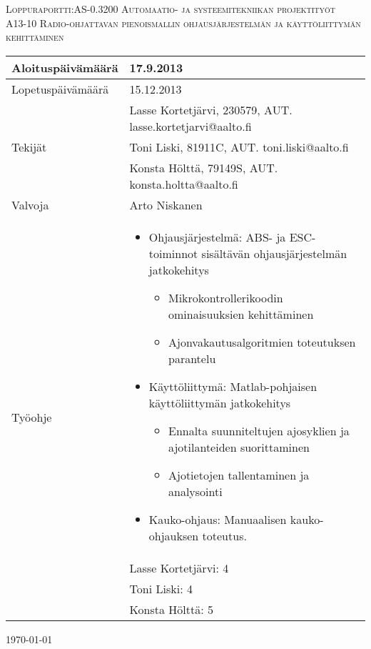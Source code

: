 \begin{titlepage}
\begin{center}

\textsc{ \LARGE Loppuraportti:AS-0.3200 Automaatio- ja systeemitekniikan projektityöt }\\[1.5cm]

\textsc{ \Large A13-10 Radio-ohjattavan pienoismallin ohjausjärjestelmän ja käyttöliittymän kehittäminen }\\[0.5cm]

\begin{tabular}{ l | p{12cm} }
	\hline
	Aloituspäivämäärä & 17.9.2013\\

	\hline
	Lopetuspäivämäärä & 15.12.2013\\

	\hline
	\multirow{3}{*}{Tekijät}
	& Lasse Kortetjärvi, 230579, AUT. lasse.kortetjarvi@aalto.fi\\
	& Toni Liski, 81911C, AUT. toni.liski@aalto.fi\\
	& Konsta Hölttä, 79149S, AUT. konsta.holtta@aalto.fi\\

	\hline
	Valvoja & Arto Niskanen\\

	\hline
	\multirow{8}{*}{Työohje} &
	\begin{itemize}
	\item Ohjausjärjestelmä: ABS- ja ESC-toiminnot sisältävän ohjausjärjestelmän jatkokehitys\begin{itemize}
	\item Mikrokontrollerikoodin ominaisuuksien kehittäminen
	\item Ajonvakautusalgoritmien toteutuksen parantelu
	\end{itemize}

	\item Käyttöliittymä: Matlab-pohjaisen käyttöliittymän jatkokehitys \begin{itemize}
	\item Ennalta suunniteltujen ajosyklien ja ajotilanteiden suorittaminen
	\item Ajotietojen tallentaminen ja analysointi
	\end{itemize}
	\item Kauko-ohjaus: Manuaalisen kauko-ohjauksen toteutus.
	\end{itemize} \\

	\hline
	\multirow{3}{*}{Opintopisteet}
	& Lasse Kortetjärvi: 4 \\
	& Toni Liski: 4 \\
	& Konsta Hölttä: 5 \\

	\hline
\end{tabular}

\vfill

{\large \today}

\end{center}
\end{titlepage}
